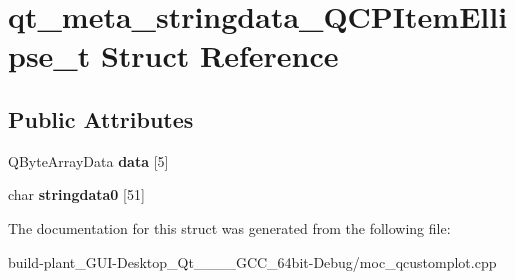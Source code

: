 \hypertarget{structqt__meta__stringdata__QCPItemEllipse__t}{}\section{qt\+\_\+meta\+\_\+stringdata\+\_\+\+Q\+C\+P\+Item\+Ellipse\+\_\+t Struct Reference}
\label{structqt__meta__stringdata__QCPItemEllipse__t}
\subsection*{Public Attributes}
\begin{DoxyCompactItemize}
\item 
\mbox{\label{structqt__meta__stringdata__QCPItemEllipse__t_ac8506617981990ea7d33afbc41f97fd2}} 
Q\+Byte\+Array\+Data {\bfseries data} \mbox{[}5\mbox{]}
\item 
\mbox{\label{structqt__meta__stringdata__QCPItemEllipse__t_a47fd49f50069acd98fc8a4f2dec3672a}} 
char {\bfseries stringdata0} \mbox{[}51\mbox{]}
\end{DoxyCompactItemize}


The documentation for this struct was generated from the following file\+:\begin{DoxyCompactItemize}
\item 
build-\/plant\+\_\+\+G\+U\+I-\/\+Desktop\+\_\+\+Qt\+\_\+\_\+\_\+\_\+\+G\+C\+C\+\_\+64bit-\/\+Debug/moc\+\_\+qcustomplot.\+cpp\end{DoxyCompactItemize}
